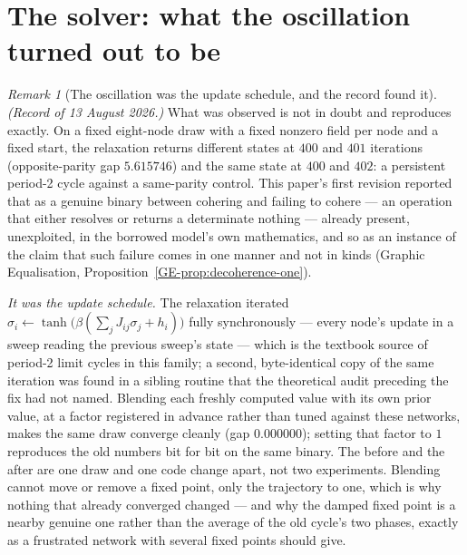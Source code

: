 \documentclass[11pt,a4paper]{article}
\theoremstyle{remark}
\newtheorem{remark}[definition]{Remark}
\begin{document}
\section{The solver: what the oscillation turned out to be}\label{sec:solver}

\begin{remark}[The oscillation was the update schedule, and the record found it]\label{rem:found}
\emph{(Record of 13 August 2026.)} What was observed is not in doubt and reproduces exactly. On a
fixed eight-node draw with a fixed nonzero field per node and a fixed start, the relaxation returns
different states at $400$ and $401$ iterations (opposite-parity gap $5.615746$) and the same state at
$400$ and $402$: a persistent period-2 cycle against a same-parity control. This paper's first
revision reported that as a genuine binary between cohering and failing to cohere --- an operation
that either resolves or returns a determinate nothing --- already present, unexploited, in the
borrowed model's own mathematics, and so as an instance of the claim that such failure comes in one
manner and not in kinds (Graphic Equalisation, Proposition~\ref{GE-prop:decoherence-one}).

\emph{It was the update schedule.} The relaxation iterated
$\sigma_i \leftarrow \tanh\!\big(\beta(\sum_j J_{ij}\sigma_j + h_i)\big)$ fully synchronously --- every
node's update in a sweep reading the previous sweep's state --- which is the textbook source of
period-2 limit cycles in this family; a second, byte-identical copy of the same iteration was found in
a sibling routine that the theoretical audit preceding the fix had not named. Blending each freshly
computed value with its own prior value, at a factor registered in advance rather than tuned against
these networks, makes the same draw converge cleanly (gap $0.000000$); setting that factor to $1$
reproduces the old numbers bit for bit on the same binary. The before and the after are one draw and
one code change apart, not two experiments. Blending cannot move or remove a fixed point, only the
trajectory to one, which is why nothing that already converged changed --- and why the damped fixed
point is a nearby genuine one rather than the average of the old cycle's two phases, exactly as a
frustrated network with several fixed points should give.


\end{remark}
\end{document}
